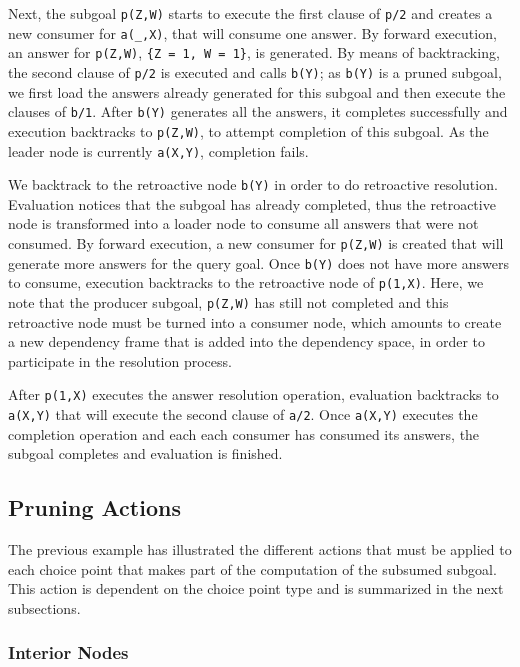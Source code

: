 Next, the subgoal \texttt{p(Z,W)} starts to execute the first clause of \texttt{p/2} and creates
a new consumer for \texttt{a(\_,X)}, that will consume one answer. By forward execution, an answer
for \texttt{p(Z,W)}, \texttt{\{Z~=~1,~W~=~1\}}, is generated. By means of backtracking, the second
clause of \texttt{p/2} is executed and calls \texttt{b(Y)}; as \texttt{b(Y)} is a pruned subgoal,
we first load the answers already generated for this subgoal and then execute the clauses of \texttt{b/1}.
After \texttt{b(Y)} generates all the answers, it completes successfully and execution backtracks to
\texttt{p(Z,W)}, to attempt completion of this subgoal. As the leader node is currently \texttt{a(X,Y)},
completion fails.

We backtrack to the retroactive node \texttt{b(Y)} in order to do retroactive resolution. Evaluation
notices that the subgoal has already completed, thus the retroactive node is transformed into a loader node
to consume all answers that were not consumed. By forward execution, a new consumer for \texttt{p(Z,W)} is
created that will generate more answers for the query goal. Once \texttt{b(Y)} does not have more answers
to consume, execution backtracks to the retroactive node of \texttt{p(1,X)}. Here, we note that
the producer subgoal, \texttt{p(Z,W)} has still not completed and this retroactive node must be turned
into a consumer node, which amounts to create a new dependency frame that is added into the dependency space,
in order to participate in the resolution process.

After \texttt{p(1,X)} executes the answer resolution
operation, evaluation backtracks to \texttt{a(X,Y)} that will execute the second clause of \texttt{a/2}.
Once \texttt{a(X,Y)} executes the completion operation and each each consumer has consumed its answers,
the subgoal completes and evaluation is finished.

\subsection{Pruning Actions}

The previous example has illustrated the different actions that must be applied to each choice point that
makes part of the computation of the subsumed subgoal. This action is dependent on the choice point
type and is summarized in the next subsections.

\subsubsection{Interior Nodes}

